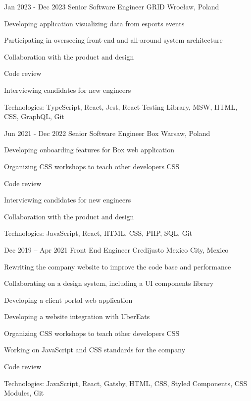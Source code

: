 \begin{sectionlist}
    \sectionlistitemjob
        {Jan 2023 - Dec 2023}
        {Senior Software Engineer}
        {GRID}
        {Wrocław, Poland}
        {
            \begin{joblisting}
                \item Developing application visualizing data from esports events
                \item Participating in overseeing front-end and all-around system architecture
                \item Collaboration with the product and design
                \item Code review
                \item Interviewing candidates for new engineers
                \item Technologies: TypeScript, React, Jest, React Testing Library, MSW, HTML, CSS, GraphQL, Git
            \end{joblisting}
        }

    \sectionlistitemjob
        {Jun 2021 - Dec 2022}
        {Senior Software Engineer}
        {Box}
        {Warsaw, Poland}
        {
            \begin{joblisting}
                \item Developing onboarding features for Box web application
                \item Organizing CSS workshops to teach other developers CSS
                \item Code review
                \item Interviewing candidates for new engineers
                \item Collaboration with the product and design
                \item Technologies: JavaScript, React, HTML, CSS, PHP, SQL, Git
            \end{joblisting}
        }

    \sectionlistitemjob
        {Dec 2019 -- Apr 2021}
        {Front End Engineer}
        {Credijusto}
        {Mexico City, Mexico}
        {
            \begin{joblisting}
                \item Rewriting the company website to improve the code base and
                    performance
                \item Collaborating on a design system, including a UI components library
                \item Developing a client portal web application
                \item Developing a website integration with UberEats
                \item Organizing CSS workshops to teach other developers CSS
                \item Working on JavaScript and CSS standards for the company
                \item Code review
                \item Technologies: JavaScript, React, Gatsby, HTML, CSS,
                    Styled Components, CSS Modules, Git
            \end{joblisting}
        }


\end{sectionlist}
